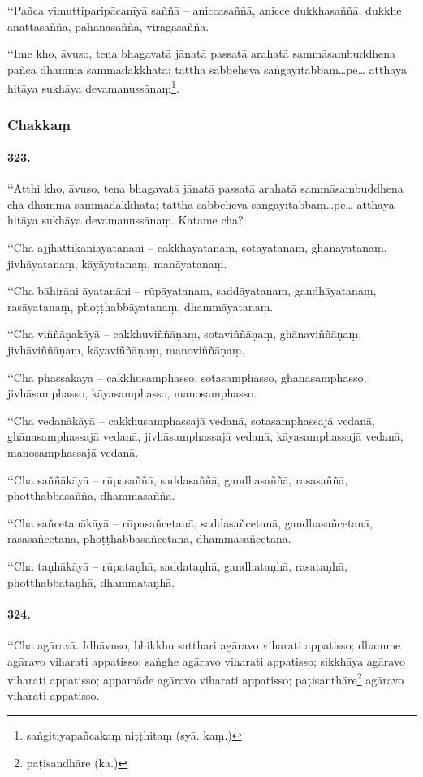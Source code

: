 ‘‘Pañca vimuttiparipācanīyā saññā – aniccasaññā, anicce dukkhasaññā, dukkhe anattasaññā, pahānasaññā, virāgasaññā.

‘‘Ime kho, āvuso, tena bhagavatā jānatā passatā arahatā sammāsambuddhena pañca dhammā sammadakkhātā; tattha sabbeheva saṅgāyitabbaṃ…pe… atthāya hitāya sukhāya devamanussānaṃ\footnote{saṅgitiyapañcakaṃ niṭṭhitaṃ (syā. kaṃ.)}.

\subsubsection{Chakkaṃ}

\paragraph{323.} ‘‘Atthi kho, āvuso, tena bhagavatā jānatā passatā arahatā sammāsambuddhena cha dhammā sammadakkhātā; tattha sabbeheva saṅgāyitabbaṃ…pe… atthāya hitāya sukhāya devamanussānaṃ. Katame cha?

‘‘Cha ajjhattikāniāyatanāni – cakkhāyatanaṃ, sotāyatanaṃ, ghānāyatanaṃ, jivhāyatanaṃ, kāyāyatanaṃ, manāyatanaṃ.

‘‘Cha bāhirāni āyatanāni – rūpāyatanaṃ, saddāyatanaṃ, gandhāyatanaṃ, rasāyatanaṃ, phoṭṭhabbāyatanaṃ, dhammāyatanaṃ.

‘‘Cha viññāṇakāyā – cakkhuviññāṇaṃ, sotaviññāṇaṃ, ghānaviññāṇaṃ, jivhāviññāṇaṃ, kāyaviññāṇaṃ, manoviññāṇaṃ.

‘‘Cha phassakāyā – cakkhusamphasso, sotasamphasso, ghānasamphasso, jivhāsamphasso, kāyasamphasso, manosamphasso.

‘‘Cha vedanākāyā – cakkhusamphassajā vedanā, sotasamphassajā vedanā, ghānasamphassajā vedanā, jivhāsamphassajā vedanā, kāyasamphassajā vedanā, manosamphassajā vedanā.

‘‘Cha saññākāyā – rūpasaññā, saddasaññā, gandhasaññā, rasasaññā, phoṭṭhabbasaññā, dhammasaññā.

‘‘Cha sañcetanākāyā – rūpasañcetanā, saddasañcetanā, gandhasañcetanā, rasasañcetanā, phoṭṭhabbasañcetanā, dhammasañcetanā.

‘‘Cha taṇhākāyā – rūpataṇhā, saddataṇhā, gandhataṇhā, rasataṇhā, phoṭṭhabbataṇhā, dhammataṇhā.

\paragraph{324.} ‘‘Cha agāravā. Idhāvuso, bhikkhu satthari agāravo viharati appatisso; dhamme agāravo viharati appatisso; saṅghe agāravo viharati appatisso; sikkhāya agāravo viharati appatisso; appamāde agāravo viharati appatisso; paṭisanthāre\footnote{paṭisandhāre (ka.)} agāravo viharati appatisso.


